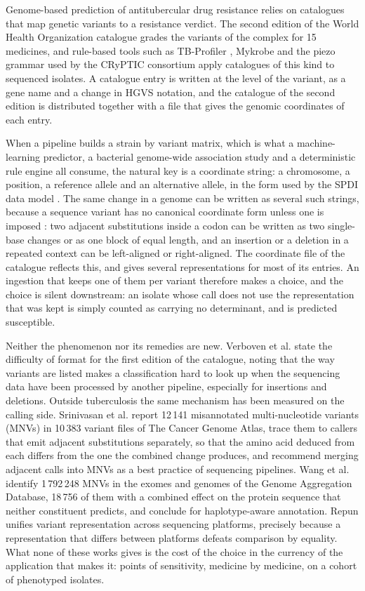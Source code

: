 \documentclass[11pt]{article}
\begin{document}
Genome-based prediction of antitubercular drug resistance relies on catalogues that map
genetic variants to a resistance verdict. The second edition of the World Health
Organization catalogue \cite{who2023} grades the variants of the complex for 15 medicines,
and rule-based tools such as TB-Profiler \cite{phelan2019,verboven2022}, Mykrobe
\cite{hunt2019} and the piezo grammar used by the CRyPTIC consortium apply catalogues of
this kind to sequenced isolates. A catalogue entry is written at the level of the variant,
as a gene name and a change in HGVS notation, and the catalogue of the second edition is
distributed together with a file that gives the genomic coordinates of each entry.

When a pipeline builds a strain by variant matrix, which is what a
machine-learning predictor, a bacterial genome-wide association study and a deterministic
rule engine all consume, the natural key is a coordinate string: a chromosome, a position,
a reference allele and an alternative allele, in the form used by the SPDI data model
\cite{holmes2020}. The same change in a genome can be written as several such strings,
because a sequence variant has no canonical coordinate form unless one is imposed
\cite{tan2015}: two adjacent substitutions inside a codon can be written as two
single-base changes or as one block of equal length, and an insertion or a deletion in a
repeated context can be left-aligned or right-aligned. The coordinate file of the
catalogue reflects this, and gives several representations for most of its entries. An
ingestion that keeps one of them per variant therefore makes a choice, and the choice is
silent downstream: an isolate whose call does not use the representation that was kept is
simply counted as carrying no determinant, and is predicted susceptible.

Neither the phenomenon nor its remedies are new. Verboven et al. \cite{verboven2022} state
the difficulty of format for the first edition of the catalogue, noting that the way
variants are listed makes a classification hard to look up when the sequencing data have
been processed by another pipeline, especially for insertions and deletions. Outside tuberculosis the same mechanism has
been measured on the calling side. Srinivasan et al. \cite{srinivasan2021} report 12\,141
misannotated multi-nucleotide variants (MNVs) in 10\,383 variant files of The Cancer
Genome Atlas, trace them to callers that emit adjacent substitutions separately, so that
the amino acid deduced from each differs from the one the combined change produces, and
recommend merging adjacent calls into MNVs as a best practice of sequencing pipelines.
Wang et al. \cite{wang2020} identify 1\,792\,248 MNVs in the exomes and genomes of the
Genome Aggregation Database, 18\,756 of them with a combined effect on the protein
sequence that neither constituent predicts, and conclude for haplotype-aware annotation.
Repun \cite{repun2024} unifies variant representation across sequencing platforms,
precisely because a representation that differs between platforms defeats comparison by
equality. What none of these works gives is the cost of the choice in the currency of the
application that makes it: points of sensitivity, medicine by medicine, on a cohort of
phenotyped isolates.
\end{document}
